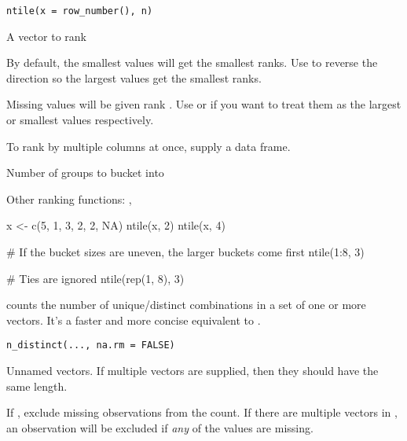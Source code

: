 \documentclass[a4paper]{book}
\begin{document}
%
\begin{Usage}
\begin{verbatim}
ntile(x = row_number(), n)
\end{verbatim}
\end{Usage}
%
\begin{Arguments}
\begin{ldescription}
\item[\code{x}] A vector to rank

By default, the smallest values will get the smallest ranks. Use 
to reverse the direction so the largest values get the smallest ranks.

Missing values will be given rank . Use  or
 if you want to treat them as the largest or smallest
values respectively.

To rank by multiple columns at once, supply a data frame.

\item[\code{n}] Number of groups to bucket into
\end{ldescription}
\end{Arguments}
%
\begin{SeeAlso}
Other ranking functions: 
,
\end{SeeAlso}
%
\begin{Examples}
\begin{ExampleCode}
x <- c(5, 1, 3, 2, 2, NA)
ntile(x, 2)
ntile(x, 4)

# If the bucket sizes are uneven, the larger buckets come first
ntile(1:8, 3)

# Ties are ignored
ntile(rep(1, 8), 3)
\end{ExampleCode}
\end{Examples}
%
\begin{Description}
 counts the number of unique/distinct combinations in a set
of one or more vectors. It's a faster and more concise equivalent to
.
\end{Description}
%
\begin{Usage}
\begin{verbatim}
n_distinct(..., na.rm = FALSE)
\end{verbatim}
\end{Usage}
%
\begin{Arguments}
\begin{ldescription}
\item[\code{...}] Unnamed vectors. If multiple vectors are supplied, then they should
have the same length.

\item[\code{na.rm}] If , exclude missing observations from the count.
If there are multiple vectors in , an observation will
be excluded if \emph{any} of the values are missing.
\end{ldescription}
\end{Arguments}
\end{document}
